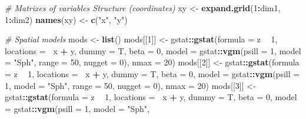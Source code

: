 \documentclass[
]{article}
\newenvironment{Shaded}{\begin{snugshade}}{\end{snugshade}}
\newcommand{\CommentTok}[1]{\textcolor[rgb]{0.56,0.35,0.01}{\textit{#1}}}
\newcommand{\DataTypeTok}[1]{\textcolor[rgb]{0.13,0.29,0.53}{#1}}
\newcommand{\DecValTok}[1]{\textcolor[rgb]{0.00,0.00,0.81}{#1}}
\newcommand{\KeywordTok}[1]{\textcolor[rgb]{0.13,0.29,0.53}{\textbf{#1}}}
\newcommand{\NormalTok}[1]{#1}
\newcommand{\OperatorTok}[1]{\textcolor[rgb]{0.81,0.36,0.00}{\textbf{#1}}}
\newcommand{\StringTok}[1]{\textcolor[rgb]{0.31,0.60,0.02}{#1}}
\begin{document}
\begin{Shaded}
\begin{Highlighting}[]
\CommentTok{# Matrixes of variables Structure (coordinates)}
\NormalTok{xy <-}\StringTok{ }\KeywordTok{expand.grid}\NormalTok{(}\DecValTok{1}\OperatorTok{:}\NormalTok{dim1, }\DecValTok{1}\OperatorTok{:}\NormalTok{dim2)}
\KeywordTok{names}\NormalTok{(xy) <-}\StringTok{ }\KeywordTok{c}\NormalTok{(}\StringTok{"x"}\NormalTok{, }\StringTok{"y"}\NormalTok{)}

\CommentTok{# Spatial models}
\NormalTok{mods <-}\StringTok{ }\KeywordTok{list}\NormalTok{()}
\NormalTok{mods[[}\DecValTok{1}\NormalTok{]] <-}\StringTok{ }\NormalTok{gstat}\OperatorTok{::}\KeywordTok{gstat}\NormalTok{(}\DataTypeTok{formula =}\NormalTok{ z }\OperatorTok{~}\StringTok{ }\DecValTok{1}\NormalTok{, }\DataTypeTok{locations =} \OperatorTok{~}\NormalTok{x }\OperatorTok{+}\StringTok{ }\NormalTok{y, }
    \DataTypeTok{dummy =}\NormalTok{ T, }\DataTypeTok{beta =} \DecValTok{0}\NormalTok{, }\DataTypeTok{model =}\NormalTok{ gstat}\OperatorTok{::}\KeywordTok{vgm}\NormalTok{(}\DataTypeTok{psill =} \DecValTok{1}\NormalTok{, }\DataTypeTok{model =} \StringTok{"Sph"}\NormalTok{, }
        \DataTypeTok{range =} \DecValTok{50}\NormalTok{, }\DataTypeTok{nugget =} \DecValTok{0}\NormalTok{), }\DataTypeTok{nmax =} \DecValTok{20}\NormalTok{)}
\NormalTok{mods[[}\DecValTok{2}\NormalTok{]] <-}\StringTok{ }\NormalTok{gstat}\OperatorTok{::}\KeywordTok{gstat}\NormalTok{(}\DataTypeTok{formula =}\NormalTok{ z }\OperatorTok{~}\StringTok{ }\DecValTok{1}\NormalTok{, }\DataTypeTok{locations =} \OperatorTok{~}\NormalTok{x }\OperatorTok{+}\StringTok{ }\NormalTok{y, }
    \DataTypeTok{dummy =}\NormalTok{ T, }\DataTypeTok{beta =} \DecValTok{0}\NormalTok{, }\DataTypeTok{model =}\NormalTok{ gstat}\OperatorTok{::}\KeywordTok{vgm}\NormalTok{(}\DataTypeTok{psill =} \DecValTok{1}\NormalTok{, }\DataTypeTok{model =} \StringTok{"Sph"}\NormalTok{, }
        \DataTypeTok{range =} \DecValTok{50}\NormalTok{, }\DataTypeTok{nugget =} \DecValTok{0}\NormalTok{), }\DataTypeTok{nmax =} \DecValTok{20}\NormalTok{)}
\NormalTok{mods[[}\DecValTok{3}\NormalTok{]] <-}\StringTok{ }\NormalTok{gstat}\OperatorTok{::}\KeywordTok{gstat}\NormalTok{(}\DataTypeTok{formula =}\NormalTok{ z }\OperatorTok{~}\StringTok{ }\DecValTok{1}\NormalTok{, }\DataTypeTok{locations =} \OperatorTok{~}\NormalTok{x }\OperatorTok{+}\StringTok{ }\NormalTok{y, }
    \DataTypeTok{dummy =}\NormalTok{ T, }\DataTypeTok{beta =} \DecValTok{0}\NormalTok{, }\DataTypeTok{model =}\NormalTok{ gstat}\OperatorTok{::}\KeywordTok{vgm}\NormalTok{(}\DataTypeTok{psill =} \DecValTok{1}\NormalTok{, }\DataTypeTok{model =} \StringTok{"Sph"}\NormalTok{, }

\end{Highlighting}
\end{Shaded}
\end{document}
